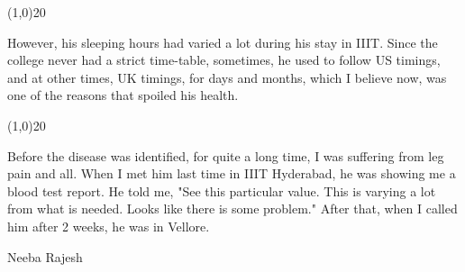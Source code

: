 \begin{english}
\begin{center}
\line(1,0){20} 
\end{center}
However, his sleeping hours had varied a lot during his stay in IIIT. Since the college never had a strict time-table, sometimes, he used to follow US timings, and at other times, UK timings, for days and months, which I believe now, was one of the reasons that spoiled his health.
\begin{center}
\line(1,0){20} 
\end{center}
Before the disease was identified, for quite a long time, I was suffering from leg pain and all. When I met him last time in IIIT Hyderabad, he was showing me a blood test report. He told me, "See this particular value. This is varying a lot from what is needed. Looks like there is some problem." After that, when I called him after 2 weeks, he was in Vellore.

\hspace*{2em}Neeba Rajesh
\end{english}
\newpage
